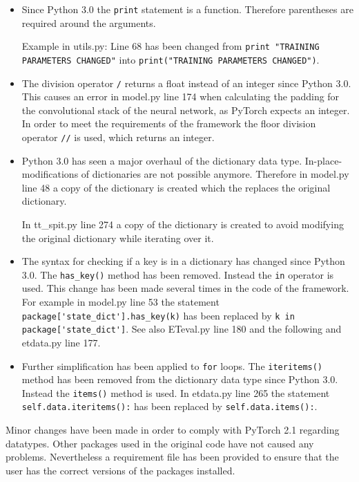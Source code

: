 \documentclass[conference]{IEEEtran}
\begin{document}
\begin{itemize}
    \item Since Python 3.0 the \verb|print| statement is a function. Therefore parentheses are required around the arguments. \cite{van_Rossum_2009}
    
    Example in utils.py: Line 68 has been changed from \verb|print "TRAINING PARAMETERS CHANGED"| into \verb|print("TRAINING PARAMETERS CHANGED")|.

    \item The division operator \verb|/| returns a float instead of an integer since Python 3.0. This causes an error in model.py line 174 when calculating the padding for the convolutional stack of the neural network, as PyTorch expects an integer. \cite{Contributors_2023} In order to meet the requirements of the framework the floor division operator \verb|//| is used, which returns an integer. \cite{van_Rossum_2009}
    
    \item Python 3.0 has seen a major overhaul of the dictionary data type. In-place-modifications of dictionaries are not possible anymore. Therefore in model.py line 48 a copy of the dictionary is created which the replaces the original dictionary.
    
    In tt\_spit.py line 274 a copy of the dictionary is created to avoid modifying the original dictionary while iterating over it.
    \cite{van_Rossum_2009}
    
    \item The syntax for checking if a key is in a dictionary has changed since Python 3.0. The \verb|has_key()| method has been removed. Instead the \verb|in| operator is used. This change has been made several times in the code of the framework. For example in model.py line 53 the statement \verb|package['state_dict'].has_key(k)| has been replaced by \verb|k in package['state_dict']|. See also ETeval.py line 180 and the following and etdata.py line 177.
    \cite{van_Rossum_2009}

    \item Further simplification has been applied to \verb|for| loops. The \verb|iteritems()| method has been removed from the dictionary data type since Python 3.0. Instead the \verb|items()| method is used. In etdata.py line 265 the statement \verb|self.data.iteritems():| has been replaced by \verb|self.data.items():|.
    
\end{itemize}
Minor changes have been made in order to comply with PyTorch 2.1 regarding datatypes. Other packages used in the original code have not caused any problems. Nevertheless a requirement file has been provided to ensure that the user has the correct versions of the packages installed.
\end{document}
